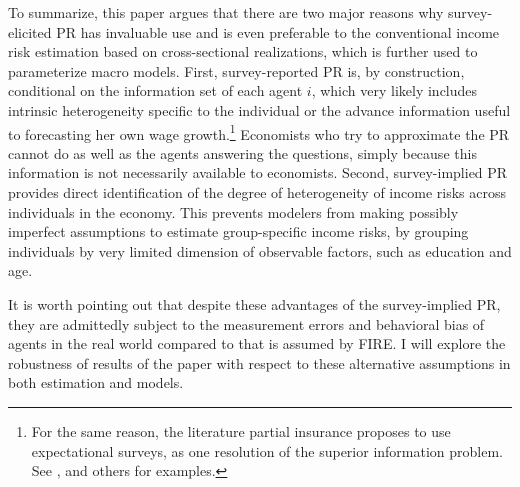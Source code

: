 To summarize, this paper argues that there are two major reasons why survey-elicited PR has invaluable use and is even preferable to the conventional income risk estimation based on cross-sectional realizations, which is further used to parameterize macro models. First, survey-reported PR is, by construction, conditional on the information set of each agent $i$, which very likely includes intrinsic heterogeneity specific to the individual or the advance information useful to  forecasting her own wage growth.\footnote{For the same reason, the literature partial insurance proposes to use expectational surveys, as one resolution of the superior information problem. See \cite{pistaferri_superior_2001}, \cite{kaufmann_disentangling_2009} and others for examples.} Economists who try to approximate the PR cannot do as well as the agents answering the questions, simply because this information is not necessarily available to economists. Second, survey-implied PR provides direct identification of the degree of heterogeneity of income risks across individuals in the economy. This prevents modelers from making possibly imperfect assumptions to estimate group-specific income risks, by grouping individuals by very limited dimension of observable factors, such as education and age. 

It is worth pointing out that despite these advantages of the survey-implied PR, they are admittedly subject to the measurement errors and behavioral bias of agents in the real world compared to that is assumed by FIRE. I will explore the robustness of results of the paper with respect to these alternative assumptions in both estimation and models.



